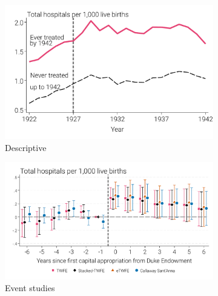 \documentclass[12pt]{article}
\begin{document}
\newpage
{}
\begin{figure}
  \caption[Hospitals by treatment status, ownership, and event time.]{Hospitals at the county-level by treatment status, ownership, and event time.}\label{fig:hosp-count}
  \centering
  \begin{minipage}{\linewidth}
  \begin{subfigure}[b]{0.49\columnwidth}
    \caption{\scriptsize{Descriptive}}
    \includegraphics[width=\linewidth]{../analysis/output/appendix/figure_b1a1_total_hospitals_by_year.pdf}  \end{subfigure} 
  \begin{subfigure}[b]{0.49\columnwidth}
    \caption{\scriptsize{Event studies}}
    \includegraphics[width=\linewidth]{../analysis/output/appendix/figure_b1b1_total_hospitals_first_stage.pdf}  \end{subfigure}  
  \begin{subfigure}[b]{0.49\columnwidth}

\end{subfigure}
\end{minipage}
\end{figure}
\end{document}
